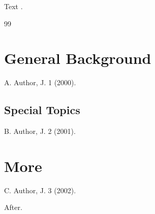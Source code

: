 \documentclass{article}
\begin{document}
Text \cite{a,b,c}.
\begin{thebibliography}{99}
\section*{General Background}
 A. Author, J. 1 (2000).
\subsection*{Special Topics}
 B. Author, J. 2 (2001).
\section*{More}
 C. Author, J. 3 (2002).
\end{thebibliography}
After.
\end{document}
